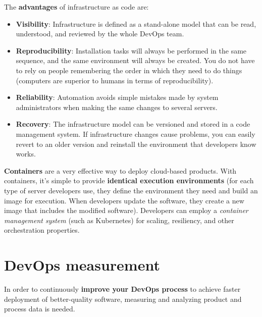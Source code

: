 \noindent The \textbf{advantages} of infrastructure as code are:
\begin{itemize}
    \item \textbf{Visibility}: Infrastructure is defined as a stand-alone model that can be read, understood, and reviewed by the whole DevOps team.
    \item \textbf{Reproducibility}: Installation tasks will always be performed in the same sequence, and the same environment will always be created. You do not have to rely on people remembering the order in which they need to do things (computers are superior to humans in terms of reproducibility).
    \item \textbf{Reliability}: Automation avoids simple mistakes made by system administrators when making the same changes to several servers.
    \item \textbf{Recovery}: The infrastructure model can be versioned and stored in a code management system. If infrastructure changes cause problems, you can easily revert to an older version and reinstall the environment that developers know works.
\end{itemize}

\textbf{Containers} are a very effective way to deploy cloud-based products. With containers, it's simple to provide \textbf{identical execution environments} (for each type of server developers use, they define the environment they need and build an image for execution. When developers update the software, they create a new image that includes the modified software). Developers can employ a \textit{container management system} (such as Kubernetes) for scaling, resiliency, and other orchestration properties.

\newpage

\section{DevOps measurement}

In order to continuously \textbf{improve your DevOps process} to achieve faster deployment of better-quality software, measuring and analyzing product and process data is needed.

